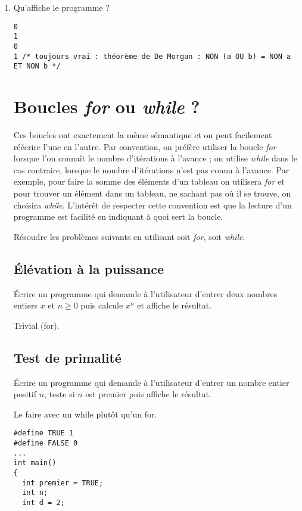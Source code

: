 \begin{enumerate}
\item Qu'affiche le programme ?
  \begin{correction}
\begin{verbatim}
0
1
0
1 /* toujours vrai : théorème de De Morgan : NON (a OU b) = NON a ET NON b */
\end{verbatim}
  \end{correction}

\section{Boucles \textit{for} ou \textit{while} ?}

Ces boucles ont exactement la même sémantique et on peut facilement
réécrire l'une en l'autre. Par convention, on préfère utiliser la
boucle \textit{for} lorsque l'on connaît le nombre d'itérations à
l'avance ; on utilise \textit{while} dans le cas contraire, lorsque le nombre
d'itérations n'est pas connu à l'avance. Par exemple, pour faire la
somme des éléments d'un tableau on utilisera \textit{for} et pour
trouver un élément dans un tableau, ne sachant pas où il se trouve, on
choisira \textit{while}. L'intérêt de respecter cette convention est
que la lecture d'un programme est facilité en indiquant à quoi sert la
boucle.

Résoudre les problèmes suivants en utilisant soit \textit{for}, soit \textit{while}.

\subsection{Élévation à la puissance}

Écrire un programme qui demande à l'utilisateur d'entrer deux nombres
entiers $x$ et $n \geq 0$ puis calcule $x^n$ et affiche le résultat.
\begin{correction}
Trivial (for).
\end{correction}
\subsection{Test de primalité}

Écrire un programme qui demande à l'utilisateur d'entrer un
nombre entier positif $n$, teste si $n$ est premier puis affiche le
résultat. 

\begin{correction}
Le faire avec un while plutôt qu'un for.
\begin{verbatim}
#define TRUE 1
#define FALSE 0
...
int main()
{
  int premier = TRUE;
  int n;
  int d = 2;
 

\end{verbatim}
\end{correction}
\end{enumerate}
